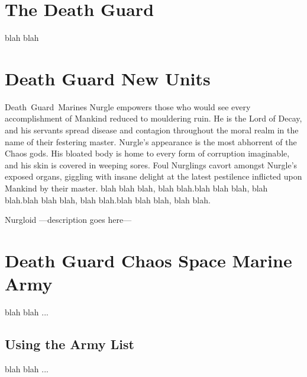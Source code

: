 \documentclass[a4paper]{article}
\begin{document}
\section{The Death Guard}
blah blah
 
%
\pagebreak
\section{Death Guard New Units}

\unit{Death Guard Marines}{
	Nurgle empowers those who would see every accomplishment of Mankind reduced to mouldering ruin.
	He is the Lord of Decay, and his servants spread disease and contagion throughout the moral realm in the name of their festering master.
	Nurgle’s appearance is the most abhorrent of the Chaos gods. His bloated body is home to every form of corruption imaginable, and his skin is covered in weeping sores.
	Foul Nurglings cavort amongst Nurgle’s exposed organs, giggling with insane delight at the latest pestilence inflicted upon Mankind by their master.
	blah blah blah, blah blah.blah blah blah, blah blah.blah blah blah, blah blah.blah blah blah, blah blah.
}
\statsEND


\unit{Nurgloid} {							%
	---description goes here---
}
\statsEND									%

%
\pagebreak
\section{Death Guard Chaos Space Marine Army}
blah blah ...
\subsection{Using the Army List}
blah blah ...
\end{document}
